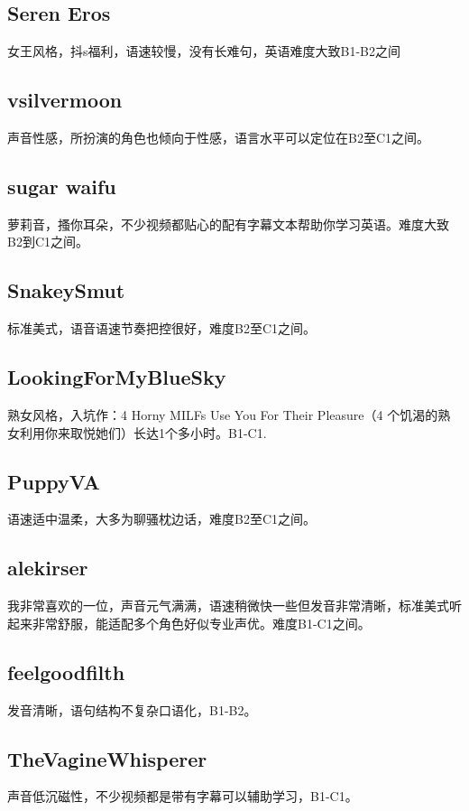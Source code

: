 \documentclass[11pt]{article}
\begin{document}
\subsection{Seren Eros}
\label{sec:orgcbff819}
女王风格，抖s福利，语速较慢，没有长难句，英语难度大致B1-B2之间

\subsection{vsilvermoon}
\label{sec:orgae31fcc}
声音性感，所扮演的角色也倾向于性感，语言水平可以定位在B2至C1之间。

\subsection{sugar waifu}
\label{sec:org97de7f9}
萝莉音，搔你耳朵，不少视频都贴心的配有字幕文本帮助你学习英语。难度大致B2到C1之间。

\subsection{SnakeySmut}
\label{sec:org8dd7469}
标准美式，语音语速节奏把控很好，难度B2至C1之间。

\subsection{LookingForMyBlueSky}
\label{sec:org2cdd21f}
熟女风格，入坑作：4 Horny MILFs Use You For Their Pleasure（4 个饥渴的熟女利用你来取悦她们）长达1个多小时。B1-C1.

\subsection{PuppyVA}
\label{sec:org6dbc2b2}
语速适中温柔，大多为聊骚枕边话，难度B2至C1之间。

\subsection{alekirser}
\label{sec:orgb841ddf}
我非常喜欢的一位，声音元气满满，语速稍微快一些但发音非常清晰，标准美式听起来非常舒服，能适配多个角色好似专业声优。难度B1-C1之间。

\subsection{feelgoodfilth}
\label{sec:orgc432eb9}
发音清晰，语句结构不复杂口语化，B1-B2。

\subsection{TheVagineWhisperer}
\label{sec:org5906ad5}
声音低沉磁性，不少视频都是带有字幕可以辅助学习，B1-C1。
\end{document}
